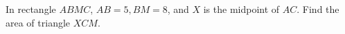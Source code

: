 In rectangle $ABMC$, $AB=5,BM=8$, and $X$ is the midpoint of $AC$. Find the area of triangle $XCM$.
